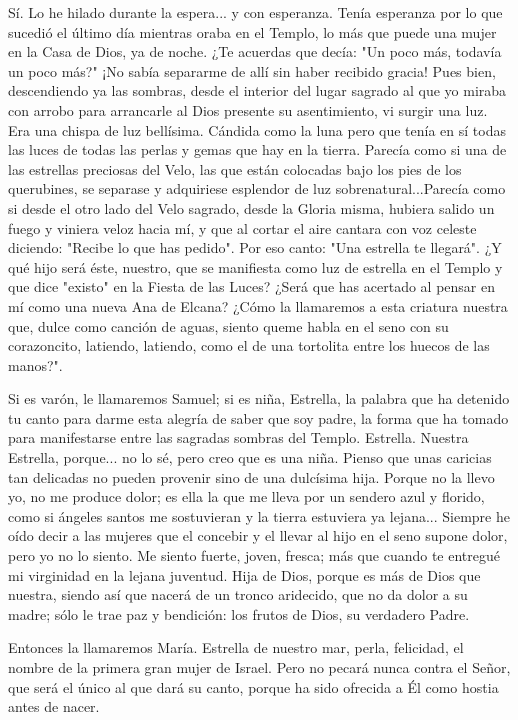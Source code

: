\documentclass[12pt]{book} %
\begin{document}
Sí. Lo he hilado durante la espera... y con esperanza. Tenía esperanza por lo que sucedió el último día mientras oraba en el Templo, lo más que puede una mujer en la Casa de Dios, ya de noche. ¿Te acuerdas que decía: "Un poco más, todavía un poco más?" ¡No sabía separarme de allí sin haber recibido gracia! Pues bien, descendiendo ya las sombras, desde el interior del lugar sagrado al que yo miraba con arrobo para arrancarle al Dios presente su asentimiento, vi surgir una luz. Era una chispa de luz bellísima. Cándida como la luna pero que tenía en sí todas las luces de todas las perlas y gemas que hay en la tierra. Parecía como si una de las estrellas preciosas del Velo, las que están colocadas bajo los pies de los querubines, se separase y adquiriese esplendor de luz sobrenatural...Parecía como si desde el otro lado del Velo sagrado, desde la Gloria misma, hubiera salido un fuego y viniera veloz hacia mí, y que al cortar el aire cantara con voz celeste diciendo: "Recibe lo que has pedido". Por eso canto: "Una estrella te llegará". ¿Y qué hijo será éste, nuestro, que se manifiesta como luz de estrella en el Templo y que dice "existo" en la Fiesta de las Luces? ¿Será que has acertado al pensar en mí como una nueva Ana de Elcana? ¿Cómo la llamaremos a esta criatura nuestra que, dulce como canción de aguas, siento queme habla en el seno con su corazoncito, latiendo, latiendo, como el de una tortolita entre los huecos de las manos?". 

Si es varón, le llamaremos Samuel; si es niña, Estrella, la palabra que ha detenido tu canto para darme esta alegría de saber que soy padre, la forma que ha tomado para manifestarse entre las sagradas sombras del Templo. Estrella. Nuestra Estrella, porque... no lo sé, pero creo que es una niña. Pienso que unas caricias tan delicadas no pueden provenir sino de una dulcísima hija. Porque no la llevo yo, no me produce dolor; es ella la que me lleva por un sendero azul y florido, como si ángeles santos me sostuvieran y la tierra estuviera ya lejana... Siempre he oído decir a las mujeres que el concebir y el llevar al hijo en el seno supone dolor, pero yo no lo siento. Me siento fuerte, joven, fresca; más que cuando te entregué mi virginidad en la lejana juventud. Hija de Dios, porque es más de Dios que nuestra, siendo así que nacerá de un tronco aridecido, que no da dolor a su madre; sólo le trae paz y bendición: los frutos de Dios, su verdadero Padre. 

Entonces la llamaremos María. Estrella de nuestro mar, perla, felicidad, el nombre de la primera gran mujer de Israel. Pero no pecará nunca contra el Señor, que será el único al que dará su canto, porque ha sido ofrecida a Él como hostia antes de nacer. 
\end{document}
